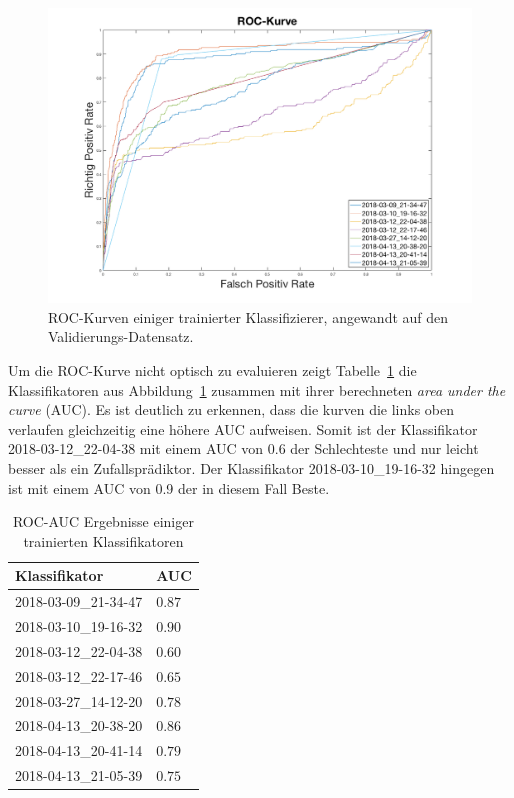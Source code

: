 \begin{figure}[htb!]
	\begin{center}
		\includegraphics[width=\textwidth]{./pics/evaluation/roc_analysis.png}
		\caption{ROC-Kurven einiger trainierter Klassifizierer, angewandt auf den Validierungs-Datensatz.}
		\label{fig:roc}
    \end{center}
\end{figure}

Um die ROC-Kurve nicht optisch zu evaluieren zeigt Tabelle~\ref{tab:auc} die Klassifikatoren aus Abbildung~\ref{fig:roc} zusammen mit ihrer berechneten \textit{area under the curve} (AUC). Es ist deutlich zu erkennen, dass die kurven die links oben verlaufen gleichzeitig eine höhere AUC aufweisen. Somit ist der Klassifikator 2018-03-12\_22-04-38 mit einem AUC von $0.6$ der Schlechteste und nur leicht besser als ein Zufallsprädiktor. Der Klassifikator 2018-03-10\_19-16-32 hingegen ist mit einem AUC von 0.9 der in diesem Fall Beste. 

\begin{table}[htb!]
\begin{center}
\begin{tabular}{ll}
	\toprule
 	Klassifikator  & AUC\\
	\midrule
  	2018-03-09\_21-34-47 &   $0.87$\\
    2018-03-10\_19-16-32 &   $0.90$\\
    2018-03-12\_22-04-38 &   $0.60$\\
    2018-03-12\_22-17-46 &   $0.65$\\
    2018-03-27\_14-12-20 &   $0.78$\\
    2018-04-13\_20-38-20 &   $0.86$\\
    2018-04-13\_20-41-14 &   $0.79$\\
    2018-04-13\_21-05-39 &   $0.75$\\
 \bottomrule
 \end{tabular}
 \end{center}
  \caption{ROC-AUC Ergebnisse einiger trainierten Klassifikatoren}
 \label{tab:auc}
 \end{table}
 
